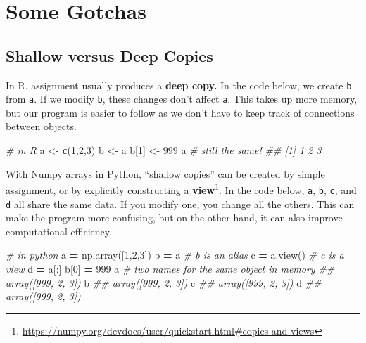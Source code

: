 \documentclass[12pt,krantz2]{krantz}
\makeatletter
\newenvironment{Shaded}{\begin{snugshade}}{\end{snugshade}}
\newcommand{\CommentTok}[1]{\textcolor[rgb]{0.37,0.37,0.37}{\textit{#1}}}
\newcommand{\DecValTok}[1]{\textcolor[rgb]{0.06,0.06,0.06}{#1}}
\newcommand{\KeywordTok}[1]{\textcolor[rgb]{0.27,0.27,0.27}{\textbf{#1}}}
\newcommand{\NormalTok}[1]{#1}
\newcommand{\OperatorTok}[1]{\textcolor[rgb]{0.43,0.43,0.43}{\textbf{#1}}}
\newcommand{\StringTok}[1]{\textcolor[rgb]{0.5,0.5,0.5}{#1}}
\renewcommand{\href}[2]{#2\footnote{\url{#1}}}
\newenvironment{kframe}{%
\medskip{}
\setlength{\fboxsep}{.8em}
 \def\at@end@of@kframe{}%
 \ifinner\ifhmode%
  \def\at@end@of@kframe{\end{minipage}}%
  \begin{minipage}{\columnwidth}%
 \fi\fi%
 \def\FrameCommand##1{\hskip\@totalleftmargin \hskip-\fboxsep
 \colorbox{shadecolor}{##1}\hskip-\fboxsep
     \hskip-\linewidth \hskip-\@totalleftmargin \hskip\columnwidth}%
 \MakeFramed {\advance\hsize-\width
   \@totalleftmargin\z@ \linewidth\hsize
   \@setminipage}}%
 {\par\unskip\endMakeFramed%
 \at@end@of@kframe}
\renewenvironment{Shaded}{\begin{kframe}}{\end{kframe}}
\makeatother
\begin{document}
\hypertarget{some-gotchas}{%
\section{Some Gotchas}\label{some-gotchas}}

\hypertarget{shallow-versus-deep-copies}{%
\subsection{Shallow versus Deep Copies}\label{shallow-versus-deep-copies}}

In R, assignment usually produces a \textbf{deep copy.} In the code below, we create \texttt{b} from \texttt{a}. If we modify \texttt{b}, these changes don't affect \texttt{a}. This takes up more memory, but our program is easier to follow as we don't have to keep track of connections between objects.

\begin{Shaded}
\begin{Highlighting}[]
\CommentTok{# in R}
\NormalTok{a <-}\StringTok{ }\KeywordTok{c}\NormalTok{(}\DecValTok{1}\NormalTok{,}\DecValTok{2}\NormalTok{,}\DecValTok{3}\NormalTok{)}
\NormalTok{b <-}\StringTok{ }\NormalTok{a}
\NormalTok{b[}\DecValTok{1}\NormalTok{] <-}\StringTok{ }\DecValTok{999}
\NormalTok{a }\CommentTok{# still the same!}
\CommentTok{## [1] 1 2 3}
\end{Highlighting}
\end{Shaded}

With Numpy arrays in Python, \href{https://numpy.org/devdocs/user/quickstart.html\#copies-and-views}{``shallow copies'' can be created by simple assignment, or by explicitly constructing a \textbf{view}}. In the code below, \texttt{a}, \texttt{b}, \texttt{c}, and \texttt{d} all share the same data. If you modify one, you change all the others. This can make the program more confusing, but on the other hand, it can also improve computational efficiency.

\begin{Shaded}
\begin{Highlighting}[]
\CommentTok{# in python}
\NormalTok{a }\OperatorTok{=}\NormalTok{ np.array([}\DecValTok{1}\NormalTok{,}\DecValTok{2}\NormalTok{,}\DecValTok{3}\NormalTok{])}
\NormalTok{b }\OperatorTok{=}\NormalTok{ a }\CommentTok{# b is an alias}
\NormalTok{c }\OperatorTok{=}\NormalTok{ a.view() }\CommentTok{# c is a view}
\NormalTok{d }\OperatorTok{=}\NormalTok{ a[:]}
\NormalTok{b[}\DecValTok{0}\NormalTok{] }\OperatorTok{=} \DecValTok{999}
\NormalTok{a }\CommentTok{# two names for the same object in memory}
\CommentTok{## array([999,   2,   3])}
\NormalTok{b}
\CommentTok{## array([999,   2,   3])}
\NormalTok{c}
\CommentTok{## array([999,   2,   3])}
\NormalTok{d}
\CommentTok{## array([999,   2,   3])}
\end{Highlighting}
\end{Shaded}
\end{document}
